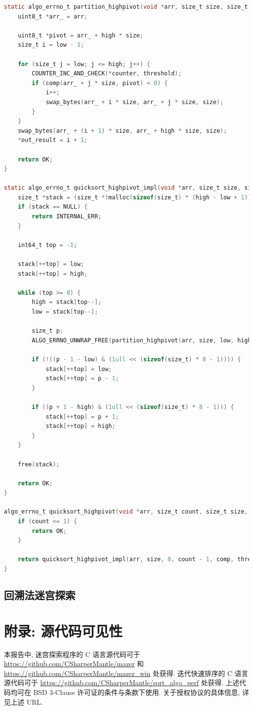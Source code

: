 \documentclass[12pt]{article}
\begin{document}
\begin{lstlisting}[language=C]
static algo_errno_t partition_highpivot(void *arr, size_t size, size_t low, size_t high, comp_t comp, uint64_t threshold, uint64_t *counter, size_t *out_result) {
    uint8_t *arr_ = arr;

    uint8_t *pivot = arr_ + high * size;
    size_t i = low - 1;

    for (size_t j = low; j <= high; j++) {
        COUNTER_INC_AND_CHECK(*counter, threshold);
        if (comp(arr_ + j * size, pivot) < 0) {
            i++;
            swap_bytes(arr_ + i * size, arr_ + j * size, size);
        }
    }
    swap_bytes(arr_ + (i + 1) * size, arr_ + high * size, size);
    *out_result = i + 1;

    return OK;
}

static algo_errno_t quicksort_highpivot_impl(void *arr, size_t size, size_t low, size_t high, comp_t comp, uint64_t threshold, uint64_t *counter) {
    size_t *stack = (size_t *)malloc(sizeof(size_t) * (high - low + 1));
    if (stack == NULL) {
        return INTERNAL_ERR;
    }
    
    int64_t top = -1;

    stack[++top] = low;
    stack[++top] = high;

    while (top >= 0) {
        high = stack[top--];
        low = stack[top--];

        size_t p;
        ALGO_ERRNO_UNWRAP_FREE(partition_highpivot(arr, size, low, high, comp, threshold, counter, &p), stack);

        if (!((p - 1 - low) & (1ull << (sizeof(size_t) * 8 - 1)))) {
            stack[++top] = low;
            stack[++top] = p - 1;
        }

        if ((p + 1 - high) & (1ull << (sizeof(size_t) * 8 - 1))) {
            stack[++top] = p + 1;
            stack[++top] = high;
        }
    }

    free(stack);

    return OK;
}

algo_errno_t quicksort_highpivot(void *arr, size_t count, size_t size, comp_t comp, uint64_t threshold, uint64_t *out_counter) {
    if (count <= 1) {
        return OK;
    }

    return quicksort_highpivot_impl(arr, size, 0, count - 1, comp, threshold, out_counter);
}
\end{lstlisting}

\subsection{回溯法迷宫探索}



\section{附录: 源代码可见性}

本报告中, 迷宫探索程序的 C 语言源代码可于 \url{https://github.com/CSharperMantle/mazer} 和 \url{https://github.com/CSharperMantle/mazer_win} 处获得. 迭代快速排序的 C 语言源代码可于 \url{https://github.com/CSharperMantle/sort_algo_perf} 处获得. 上述代码均可在 BSD 3-Clause 许可证的条件与条款下使用. 关于授权协议的具体信息, 详见上述 URL.
\end{document}
